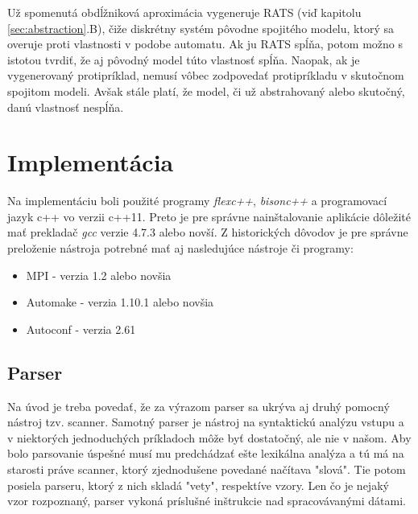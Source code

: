 \documentclass[11pt,final,oneside]{fithesis}
\begin{document}
U\v z spomenut\'a obd\'l\v znikov\'a aproxim\'acia vygeneruje RATS (vi\v d kapitolu \ref{sec:abstraction}.B), \v ci\v ze diskr\'etny syst\'em p\^ ovodne spojit\'eho 
modelu, ktor\'y sa overuje proti vlastnosti v podobe automatu. Ak ju RATS sp\'l\v na, potom mo\v zno s istotou tvrdi\v t, \v ze aj p\^ ovodn\'y model t\'uto
vlastnos\v t sp\'l\v na. Naopak, ak je vygenerovan\'y protipr\'iklad, nemus\'i v\^ obec zodpoveda\v t protipr\'ikladu v skuto\v cnom spojitom modeli.
Av\v sak st\'ale plat\'i, \v ze model, \v ci u\v z abstrahovan\'y alebo skuto\v cn\'y, dan\'u vlastnos\v t nesp\'l\v na. \cite{BIODIVINE}

\chapter{Implement\' acia}
Na implement\'aciu boli pou\v zit\'e programy {\it flexc++}, {\it bisonc++} a programovac\'i jazyk c++ vo verzii c++11. Preto je pre spr\'avne 
nain\v stalovanie aplik\'acie d\^ ole\v zit\'e ma\v t preklada\v c {\it gcc} verzie 4.7.3 alebo nov\v s\'i. Z historick\'ych d\^ ovodov je pre spr\'avne 
prelo\v zenie n\'astroja potrebn\'e ma\v t aj nasleduj\'uce n\'astroje \v ci programy:
\begin{itemize}
\item MPI - verzia 1.2 alebo nov\v sia
\item Automake - verzia 1.10.1 alebo nov\v sia
\item Autoconf - verzia 2.61
\end{itemize}
\cite{sybila-biodivine}

\section{Parser}
\label{sec:implParser}
Na \'uvod je treba poveda\v t, \v ze za v\'yrazom parser sa ukr\'yva aj druh\'y pomocn\'y n\'astroj tzv. scanner. Samotn\'y parser je n\'astroj na syntaktick\'u 
anal\'yzu vstupu a v niektor\'ych jednoduch\'ych pr\'ikladoch m\^ o\v ze by\v t dostato\v cn\'y, ale nie v na\v som. Aby bolo parsovanie \'uspe\v sn\'e mus\'i
mu predch\'adza\v t e\v ste lexik\'alna anal\'yza a t\'u m\'a na starosti pr\'ave scanner, ktor\'y zjednodu\v sene povedan\'e na\v c\'itava "slov\'a". Tie potom
posiela parseru, ktor\'y z nich sklad\'a "vety", respekt\'ive vzory. Len \v co je nejak\'y vzor rozpoznan\'y, parser vykon\'a pr\'islu\v sn\'e in\v strukcie 
nad spracov\'avan\'ymi d\'atami.
\end{document}
